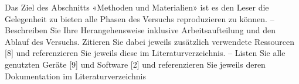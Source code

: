 Das Ziel des Abschnitts «Methoden und Materialien» ist es den Leser die Gelegenheit zu bieten alle Phasen des Versuchs reproduzieren zu können. 
–	Beschreiben Sie Ihre Herangehensweise inklusive Arbeitsaufteilung und den Ablauf des Versuchs. Zitieren Sie dabei jeweils zusätzlich verwendete Ressourcen [8] und referenzieren Sie jeweils diese im Literaturverzeichnis.
–	Listen Sie alle genutzten Geräte [9] und Software [2] und referenzieren Sie jeweils deren Dokumentation im Literaturverzeichnis